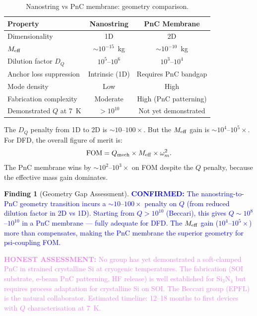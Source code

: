 \documentclass[11pt]{article}
\theoremstyle{definition}
\newtheorem{finding}[theorem]{Finding}
\theoremstyle{remark}
\newcommand{\Qmech}{Q_{\rm mech}}
\newcommand{\confirmed}[1]{\textcolor{blue}{\textbf{CONFIRMED:} #1}}
\newcommand{\honest}[1]{\textcolor{violet}{\textbf{HONEST ASSESSMENT:} #1}}
\begin{document}
\begin{table}[H]
\centering
\caption{Nanostring vs PnC membrane: geometry comparison.}
\renewcommand{\arraystretch}{1.3}
\begin{tabular}{lcc}
\toprule
\textbf{Property} & \textbf{Nanostring} & \textbf{PnC Membrane} \\
\midrule
Dimensionality & 1D & 2D \\
$M_{\rm eff}$ & $\sim 10^{-15}$~kg & $\sim 10^{-10}$~kg \\
Dilution factor $D_Q$ & $10^5$--$10^6$ & $10^3$--$10^4$ \\
Anchor loss suppression & Intrinsic (1D) & Requires PnC bandgap \\
Mode density & Low & High \\
Fabrication complexity & Moderate & High (PnC patterning) \\
Demonstrated $Q$ at 7~K & $> 10^{10}$ & Not yet demonstrated \\
\bottomrule
\end{tabular}
\end{table}

The $D_Q$ penalty from 1D to 2D is $\sim 10$--$100\times$. But the
$M_{\rm eff}$ gain is $\sim 10^4$--$10^5\times$. For DFD, the
overall figure of merit is:
\begin{equation}
\mathrm{FOM} = \Qmech \times M_{\rm eff} \times \omega_m^2.
\end{equation}
The PnC membrane wins by $\sim 10^2$--$10^3\times$ on FOM despite
the $Q$ penalty, because the effective mass gain dominates.

\begin{finding}[Geometry Gap Assessment]
\label{find:geometry_gap}
\confirmed{The nanostring-to-PnC geometry transition incurs a
$\sim 10$--$100\times$ penalty on $Q$ (from reduced dilution
factor in 2D vs 1D). Starting from $Q > 10^{10}$ (Beccari),
this gives $Q \sim 10^8$--$10^{10}$ in a PnC membrane --- fully
adequate for DFD. The $M_{\rm eff}$ gain ($10^4$--$10^5\times$)
more than compensates, making the PnC membrane the superior
geometry for psi-coupling FOM.}

\honest{No group has yet demonstrated a soft-clamped PnC in
strained crystalline Si at cryogenic temperatures. The fabrication
(SOI substrate, e-beam PnC patterning, HF release) is well
established for Si$_3$N$_4$ but requires process adaptation for
crystalline Si on SOI. The Beccari group (EPFL) is the natural
collaborator. Estimated timeline: 12--18 months to first devices
with $Q$ characterisation at 7~K.}
\end{finding}
\end{document}

